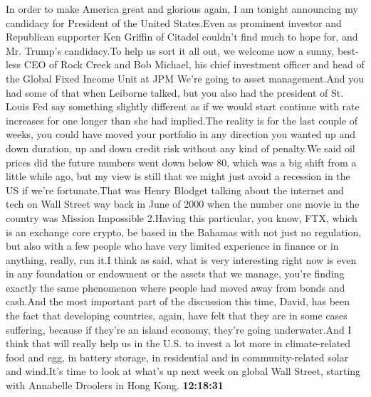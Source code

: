 \documentclass{article}%
\begin{document}
In order to make America great and glorious again, I am tonight announcing my candidacy for President of the United States.Even as prominent investor and Republican supporter Ken Griffin of Citadel couldn't find much to hope for, and Mr. Trump's candidacy.To help us sort it all out, we welcome now a sunny, best{-}less CEO of Rock Creek and Bob Michael, his chief investment officer and head of the Global Fixed Income Unit at JPM We're going to asset management.And you had some of that when Leiborne talked, but you also had the president of St. Louis Fed say something slightly different as if we would start continue with rate increases for one longer than she had implied.The reality is for the last couple of weeks, you could have moved your portfolio in any direction you wanted up and down duration, up and down credit risk without any kind of penalty.We said oil prices did the future numbers went down below 80, which was a big shift from a little while ago, but my view is still that we might just avoid a recession in the US if we're fortunate.That was Henry Blodget talking about the internet and tech on Wall Street way back in June of 2000 when the number one movie in the country was Mission Impossible 2.Having this particular, you know, FTX, which is an exchange core crypto, be based in the Bahamas with not just no regulation, but also with a few people who have very limited experience in finance or in anything, really, run it.I think as said, what is very interesting right now is even in any foundation or endowment or the assets that we manage, you're finding exactly the same phenomenon where people had moved away from bonds and cash.And the most important part of the discussion this time, David, has been the fact that developing countries, again, have felt that they are in some cases suffering, because if they're an island economy, they're going underwater.And I think that will really help us in the U.S. to invest a lot more in climate{-}related food and egg, in battery storage, in residential and in community{-}related solar and wind.It's time to look at what's up next week on global Wall Street, starting with Annabelle Droolers in Hong Kong.%
\textbf{12:18:31}%
\newline%
\end{document}
